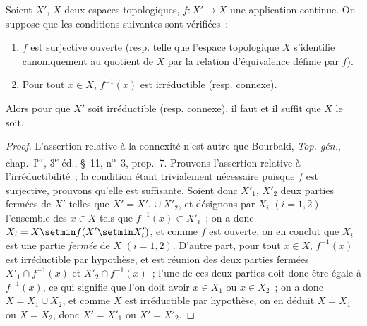 \begin{lemma}[4.4.2]
Soient $X'$, $X$ deux espaces topologiques, $f:X'\to X$ une application
continue. On suppose que les conditions suivantes sont vérifiées~:
\begin{enumerate}
\item[\textup{(i)}] $f$ est surjective ouverte \textup{(resp.} telle que l'espace topologique
$X$ s'identifie canoniquement au quotient de $X$ par la relation d'équivalence
définie par $f$\textup{)}.


\item[\textup{(ii)}] Pour tout $x\in X$, $f^{-1}(x)$ est irréductible \textup{(resp.} connexe\textup{)}.
\end{enumerate}
Alors pour que $X'$ soit irréductible \textup{(resp.} connexe\textup{)}, il faut et il suffit
que $X$ le soit.
\end{lemma}

\begin{proof}
L'assertion relative à la connexité n'est autre que Bourbaki,
\emph{Top. gén.}, chap.~I\textsuperscript{er}, 3\textsuperscript{e} éd.,
\S~11, n\textsuperscript{o}~3, prop.~7. Prouvons l'assertion relative à
l'irréductibilité~; la condition étant trivialement nécessaire puisque $f$
est surjective, prouvons qu'elle est suffisante. Soient donc $X'_1$, $X'_2$
deux parties fermées de $X'$ telles que $X'=X'_1\cup X'_2$, et désignons par
$X_i$ $(i=1,2)$ l'ensemble des $x\in X$ tels que $f^{-1}(x)\subset X'_i$~; on
a donc $X_i=X\setmin f(X'\setmin X'_i)$, et comme $f$ est ouverte, on en conclut que $X_i$
est une partie \emph{fermée} de $X$ $(i=1,2)$. D'autre part, pour tout
$x\in X$, $f^{-1}(x)$ est irréductible par hypothèse, et est réunion des deux
parties fermées $X'_1\cap f^{-1}(x)$ et $X'_2\cap f^{-1}(x)$~; l'une de ces
deux parties doit donc être égale à $f^{-1}(x)$, ce qui signifie que l'on doit
avoir $x\in X_1$ ou $x\in X_2$~; on a donc $X=X_1\cup X_2$, et comme $X$ est
irréductible par hypothèse, on en déduit $X=X_1$ ou $X=X_2$, donc
$X'=X'_1$ ou $X'=X'_2$.
\end{proof}

